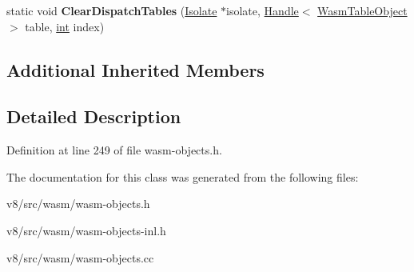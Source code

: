 \begin{DoxyCompactItemize}
\item 
\mbox{\label{classv8_1_1internal_1_1WasmTableObject_abde58cb3af4b53a24af9c8cbc9e68417}} 
static void {\bfseries Clear\+Dispatch\+Tables} (\mbox{\hyperlink{classv8_1_1internal_1_1Isolate}{Isolate}} $\ast$isolate, \mbox{\hyperlink{classv8_1_1internal_1_1Handle}{Handle}}$<$ \mbox{\hyperlink{classv8_1_1internal_1_1WasmTableObject}{Wasm\+Table\+Object}} $>$ table, \mbox{\hyperlink{classint}{int}} index)
\end{DoxyCompactItemize}
\subsection*{Additional Inherited Members}


\subsection{Detailed Description}


Definition at line 249 of file wasm-\/objects.\+h.



The documentation for this class was generated from the following files\+:\begin{DoxyCompactItemize}
\item 
v8/src/wasm/wasm-\/objects.\+h\item 
v8/src/wasm/wasm-\/objects-\/inl.\+h\item 
v8/src/wasm/wasm-\/objects.\+cc\end{DoxyCompactItemize}
